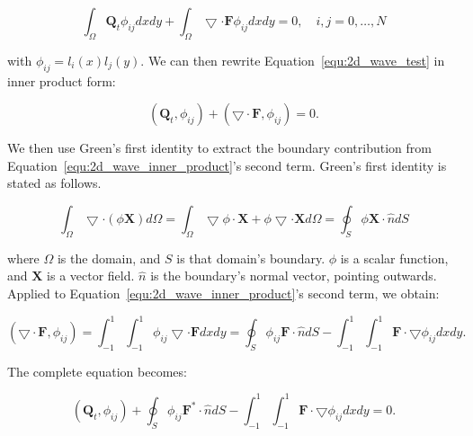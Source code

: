 \begin{equation} %
    \int_{\Omega} \mathbf{Q}_t \phi_{i j} dx dy
    + \int _{\Omega} \bigtriangledown \cdot \mathbf{F} \phi_{i j} dx dy = 0, \quad i,j = 0, \ldots, N \label{equ:2d_wave_test}
\end{equation}

\noindent
with \(\phi_{i j} = l_i(x)l_j(y)\). We can then rewrite Equation~\ref{equ:2d_wave_test} in inner
product form: 

\begin{equation} \label{equ:2d_wave_inner_product}
    \left( \mathbf{Q}_t, \phi_{i j} \right) + \left( \bigtriangledown \cdot \mathbf{F}, \phi_{i j} \right) = 0.
\end{equation}

We then use Green's first identity to extract the boundary contribution from
Equation~\ref{equ:2d_wave_inner_product}'s second term. Green's first identity is stated as follows.

\begin{equation}
    \int_{\Omega} \bigtriangledown \cdot \left( \phi \mathbf{X} \right) d\Omega  = 
    \int_{\Omega} \bigtriangledown \phi \cdot \mathbf{X} + \phi \bigtriangledown \cdot \mathbf{X} d\Omega = \oint _{S} \phi \mathbf{X} \cdot \widehat{n} dS
\end{equation}

\noindent
where \(\Omega \) is the domain, and \(S\) is that domain's boundary. \(\phi \) is a scalar
function, and \(\mathbf{X}\) is a vector field. \(\widehat{n}\) is the boundary's normal vector,
pointing outwards. Applied to Equation~\ref{equ:2d_wave_inner_product}'s second term, we obtain:

\begin{equation} \label{equ:flux_green}
    \left( \bigtriangledown \cdot \mathbf{F}, \phi_{i j} \right) = \int_{-1}^{1}\int_{-1}^{1}\phi_{i j} \bigtriangledown \cdot \mathbf{F} dx dy = \oint_{S}\phi_{i j} \mathbf{F} \cdot \widehat{n}dS - \int_{-1}^{1}\int_{-1}^{1} \mathbf{F} \cdot \bigtriangledown \phi_{i j} dx dy.
\end{equation}

\noindent
The complete equation becomes:

\begin{equation} \label{equ:integral_equ}
    \left( \mathbf{Q}_t, \phi_{i j} \right) + \oint_{S}\phi_{i j} \mathbf{F}^* \cdot \widehat{n}dS - \int_{-1}^{1}\int_{-1}^{1} \mathbf{F} \cdot \bigtriangledown \phi_{i j} dx dy = 0.
\end{equation}

